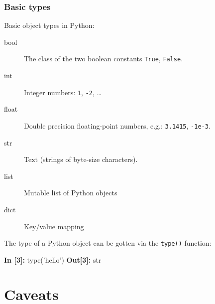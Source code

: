 \documentclass[english,serif,mathserif,xcolor=pdftex,dvipsnames,table]{beamer}
\begin{document}
\begin{frame}[fragile]
  \frametitle{Basic types}
  Basic object types in Python:
  \begin{description}
  \item[bool] The class of the two boolean constants \texttt{True}, \texttt{False}.
  \item[int] Integer numbers: \texttt{1}, \texttt{-2}, \ldots
  \item[float] Double precision floating-point numbers, e.g.:
    \texttt{3.1415}, \texttt{-1e-3}.
  \item[str] Text (strings of byte-size characters).
  \item[list] Mutable list of Python objects
  \item[dict] Key/value mapping
  \end{description}

  \+ The type of a Python object can be gotten via the \texttt{type()} function:
\begin{semiverbatim}
{\color{blue}\bfseries In [3]:} type('hello')
{\color{red}\bfseries Out[3]:} str
\end{semiverbatim}
\end{frame}


\section{Caveats}
\end{document}
